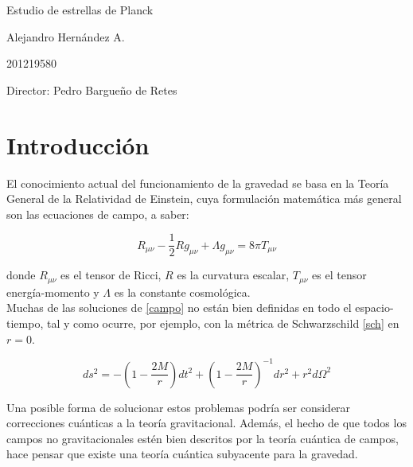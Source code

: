 \documentclass[prb,aps,preprintnumbers,amsmath,amssymb]{article}
\begin{document}
\begin{center}
\Huge
Estudio de estrellas de Planck 

\vspace{3mm}
\Large Alejandro Hernández A.

\large
201219580


\vspace{2mm}
\Large
Director: Pedro Bargueño de Retes

\normalsize
\vspace{2mm}

\date{}
\end{center}


\normalsize
\section{Introducción}


El conocimiento actual del funcionamiento de la gravedad se basa en la Teoría General de la Relatividad de Einstein, cuya formulación matemática más general son las ecuaciones de campo, a saber:

\begin{equation}
\label{campo}
R_{\mu \nu} - \frac{1}{2} R g_{\mu \nu} + \Lambda g_{\mu \nu} = 8 \pi T_{\mu \nu}
\end{equation}

donde $R_{\mu \nu}$ es el tensor de Ricci, $R$ es la curvatura escalar, $T_{\mu \nu}$ es el tensor energía-momento y $\Lambda$ es la constante cosmológica.\\

Muchas de las soluciones de \eqref{campo} no están bien definidas en todo el espacio-tiempo, tal y como ocurre, por ejemplo, con la métrica de Schwarzschild \eqref{sch}  en $r = 0$.

\begin{equation}
\label{sch}
ds^2 = -\left( 1 - \frac{2M}{r} \right) dt^2 + \left( 1 - \frac{2M}{r} \right)^{-1} dr^2 + r^2d\Omega ^2
\end{equation}

Una posible forma de solucionar estos problemas podría ser considerar correcciones cuánticas a la teoría gravitacional. Además, el hecho de que todos los campos no gravitacionales estén bien descritos por la teoría cuántica de campos, hace pensar que existe una teoría cuántica subyacente para la gravedad.\\ 
\end{document}
